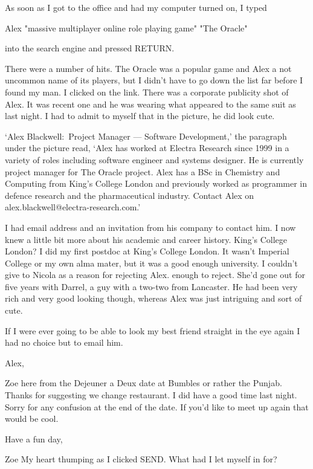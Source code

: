 As soon as I got to the office and had my computer turned on, I
typed

\startmessage
Alex "massive multiplayer online role playing game" "The Oracle"
\stopmessage

into the search engine and pressed {\twelvess RETURN}.

There were a number of hits. {\twelvesl The Oracle\/} was
a popular game and Alex a not uncommon name of its players, but I didn't have to go down the list far before I found
my man. I clicked on the link. There was a corporate publicity shot
of Alex. It was recent one and he was wearing what appeared to the same
suit as last night. I had to admit to myself that in the picture, he
did look cute.

`Alex Blackwell:~Project Manager --- Software Development,' the
paragraph under the picture read, `Alex has worked at Electra
Research since 1999 in a variety of roles including software
engineer and systems designer. He is currently project manager for
{\twelvesl The Oracle\/} project. Alex has a BSc in Chemistry and Computing from
King's College London and previously worked as programmer in defence research and the pharmaceutical industry. Contact Alex on
alex.blackwell@electra-research.com.'

I had email address and an invitation from his company to contact
him. I now knew a little bit more about his academic and career
history. King's College London? I did my first postdoc at King's
College London. It wasn't Imperial College or my own alma
mater, but it was a good enough university. I couldn't give to Nicola as
a reason for rejecting Alex. enough to reject. She'd
gone out for five years with Darrel, a guy with a two-two from Lancaster. He had been very rich and very good looking though, whereas
Alex was just intriguing and sort of cute.

If I were ever going to be able to look my best friend straight in
the eye again I had no choice but to email him.

\startmessage
Alex,

Zoe here from the Dejeuner a Deux date at Bumbles
or rather the Punjab. Thanks for suggesting we
change restaurant. I did have a good time
last night. Sorry for any confusion at the end
of the date. If you'd like to meet up again
that would be cool.

Have a fun day,

Zoe
\stopmessage
\vskip 12pt
My heart thumping as I clicked {\twelvess SEND}.  What had I let
myself in for?

